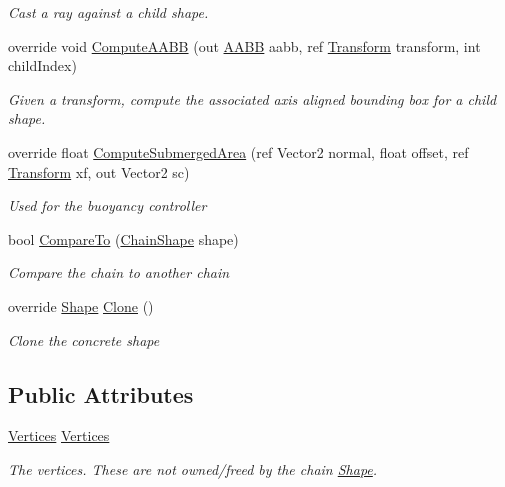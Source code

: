 \begin{DoxyCompactItemize}
\begin{DoxyCompactList}\small\item\em Cast a ray against a child shape. \end{DoxyCompactList}\item 
override void \hyperlink{class_farseer_physics_1_1_collision_1_1_shapes_1_1_chain_shape_a1af8f0dd3a6e0bcf96b6d4ee6f83cce9}{Compute\+A\+A\+B\+B} (out \hyperlink{struct_farseer_physics_1_1_collision_1_1_a_a_b_b}{A\+A\+B\+B} aabb, ref \hyperlink{struct_farseer_physics_1_1_common_1_1_transform}{Transform} transform, int child\+Index)
\begin{DoxyCompactList}\small\item\em Given a transform, compute the associated axis aligned bounding box for a child shape. \end{DoxyCompactList}\item 
override float \hyperlink{class_farseer_physics_1_1_collision_1_1_shapes_1_1_chain_shape_a0373cabe4e3bb81c4160064ad48b27af}{Compute\+Submerged\+Area} (ref Vector2 normal, float offset, ref \hyperlink{struct_farseer_physics_1_1_common_1_1_transform}{Transform} xf, out Vector2 sc)
\begin{DoxyCompactList}\small\item\em Used for the buoyancy controller \end{DoxyCompactList}\item 
bool \hyperlink{class_farseer_physics_1_1_collision_1_1_shapes_1_1_chain_shape_ac75a9b332c0ecc37ac489e308a2d4e5e}{Compare\+To} (\hyperlink{class_farseer_physics_1_1_collision_1_1_shapes_1_1_chain_shape}{Chain\+Shape} shape)
\begin{DoxyCompactList}\small\item\em Compare the chain to another chain \end{DoxyCompactList}\item 
override \hyperlink{class_farseer_physics_1_1_collision_1_1_shapes_1_1_shape}{Shape} \hyperlink{class_farseer_physics_1_1_collision_1_1_shapes_1_1_chain_shape_ae59a8182d965159d59731c5f14b2b8c2}{Clone} ()
\begin{DoxyCompactList}\small\item\em Clone the concrete shape \end{DoxyCompactList}\end{DoxyCompactItemize}
\subsection*{Public Attributes}
\begin{DoxyCompactItemize}
\item 
\hyperlink{class_farseer_physics_1_1_common_1_1_vertices}{Vertices} \hyperlink{class_farseer_physics_1_1_collision_1_1_shapes_1_1_chain_shape_a5e122a3851ec154ec51873b16a190741}{Vertices}
\begin{DoxyCompactList}\small\item\em The vertices. These are not owned/freed by the chain \hyperlink{class_farseer_physics_1_1_collision_1_1_shapes_1_1_shape}{Shape}. \end{DoxyCompactList}\end{DoxyCompactItemize}
